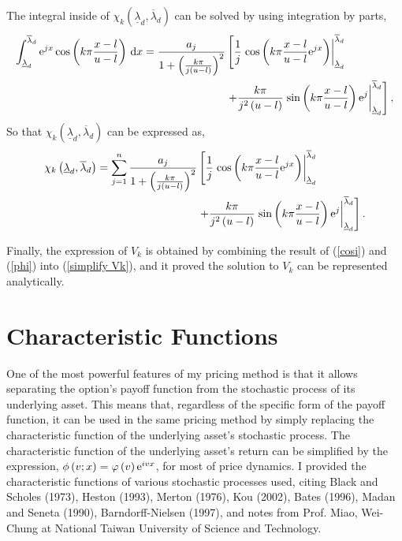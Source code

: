The integral inside of $\chi_k \left( \underline{\lambda}_d, \overline{\lambda}_d \right)$ can be solved by using integration by parts,
\begin{align}
    \int_{\underline{\lambda}_d}^{\overline{\lambda}_d} {\rm e}^{jx} \cos \left( k \pi \frac{x-l}{u-l} \right) \, {\rm d}x= \frac{a_j}{1+\left(\frac{k\pi}{j\left(u-l\right)}\right)^2} & \left[\frac{1}{j}\left.\cos\left(k\pi\frac{x-l}{u-l}{\rm e}^{jx}\right)\right|_{\underline{\lambda}_d} ^{\overline{\lambda}_d}\right. \nonumber \\
    & \left.+\frac{k\pi}{j^2\left(u-l\right)}\left.\sin\left(k\pi\frac{x-l}{u-l}\right){\rm e}^j\right|_{\underline{\lambda}_d} ^{\overline{\lambda}_d}\right], \nonumber
\end{align}
So that $\chi_k \left( \underline{\lambda}_d, \overline{\lambda}_d \right)$ can be expressed as,
\begin{align}
    \chi_k \left( \underline{\lambda}_d, \overline{\lambda}_d \right) =\sum_{j=1}^{n}\frac{a_j}{1+\left(\frac{k\pi}{j\left(u-l\right)}\right)^2} & \left[\frac{1}{j}\left.\cos\left(k\pi\frac{x-l}{u-l}{\rm e}^{jx}\right)\right|_{\underline{\lambda}_d} ^{\overline{\lambda}_d}\right. \nonumber \\
    & \left.+\frac{k\pi}{j^2\left(u-l\right)}\left.\sin\left(k\pi\frac{x-l}{u-l}\right){\rm e}^j\right|_{\underline{\lambda}_d} ^{\overline{\lambda}_d}\right]. \label{cosi}
\end{align}

Finally, the expression of $V_k$ is obtained by combining the result of (\ref{cosi}) and (\ref{phi}) into (\ref{simplify Vk}), and it proved the solution to $V_k$ can be represented analytically.

\section{Characteristic Functions}
One of the most powerful features of my pricing method is that it allows separating the option's payoff function from the stochastic process of its underlying asset. This means that, regardless of the specific form of the payoff function, it can be used in the same pricing method by simply replacing the characteristic function of the underlying asset's stochastic process. The characteristic function of the underlying asset's return can be simplified by the expression, $\phi\left(v;x\right)=\varphi\left(v\right){\rm e}^{iv x}$, for most of price dynamics. I provided the characteristic functions of various stochastic processes used, citing Black and Scholes (1973), Heston (1993), Merton (1976), Kou (2002), Bates (1996), Madan and Seneta (1990), Barndorff-Nielsen (1997), and notes from Prof. Miao, Wei-Chung at National Taiwan University of Science and Technology.\\

